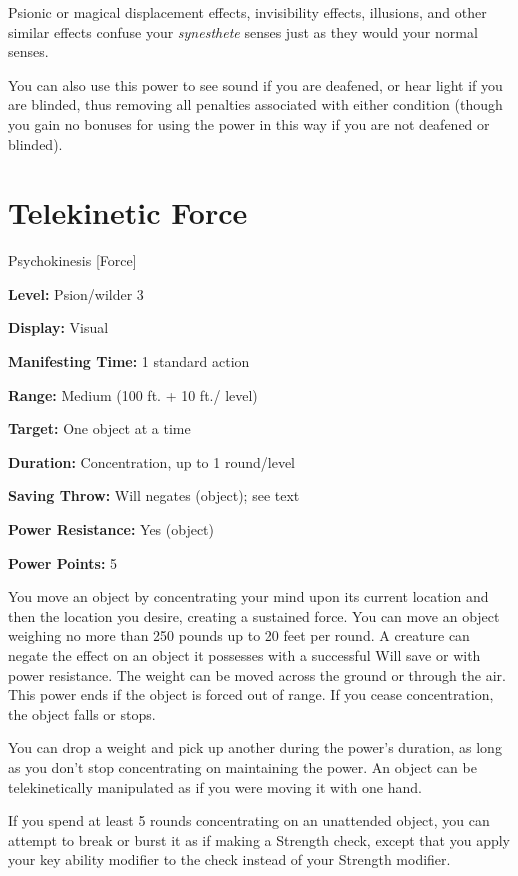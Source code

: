 \documentclass{article}
\begin{document}
Psionic or magical displacement effects, invisibility effects, illusions, and other 
similar effects confuse your \textit{synesthete }senses just as they would your 
normal senses.

You can also use this power to see sound if you are deafened, or hear light if 
you are blinded, thus removing all penalties associated with either condition (though 
you gain no bonuses for using the power in this way if you are not deafened or 
blinded).

\vspace{12pt}
\section*{Telekinetic Force}

Psychokinesis [Force]

\textbf{Level:} Psion/wilder 3

\textbf{Display:} Visual

\textbf{Manifesting Time:} 1 standard action

\textbf{Range:} Medium (100 ft. + 10 ft./ level)

\textbf{Target:} One object at a time

\textbf{Duration:} Concentration, up to 1 round/level

\textbf{Saving Throw:} Will negates (object); see text

\textbf{Power Resistance:} Yes (object)

\textbf{Power Points:} 5

You move an object by concentrating your mind upon its current location and then 
the location you desire, creating a sustained force. You can move an object weighing 
no more than 250 pounds up to 20 feet per round. A creature can negate the effect 
on an object it possesses with a successful Will save or with power resistance. 
The weight can be moved across the ground or through the air. This power ends if 
the object is forced out of range. If you cease concentration, the object falls 
or stops.

You can drop a weight and pick up another during the power's duration, as long 
as you don't stop concentrating on maintaining the power. An object can be telekinetically 
manipulated as if you were moving it with one hand.

If you spend at least 5 rounds concentrating on an unattended object, you can attempt 
to break or burst it as if making a Strength check, except that you apply your 
key ability modifier to the check instead of your Strength modifier.
\end{document}
